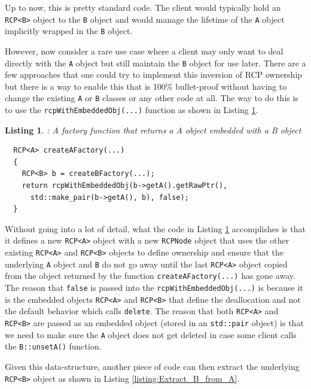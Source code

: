 \documentclass[pdf,ps2pdf,11pt]{SANDreport}
\newtheorem{listing}{Listing}
\begin{document}
Up to now, this is pretty standard code.  The client would typically
hold an {}\texttt{RCP<B>} object to the {}\texttt{B} object and would
manage the lifetime of the {}\texttt{A} object implicitly wrapped in
the {}\texttt{B} object.

However, now consider a rare use case where a client may only want to
deal directly with the {}\texttt{A} object but still maintain the
{}\texttt{B} object for use later.  There are a few approaches that
one could try to implement this inversion of RCP ownership but there
is a way to enable this that is 100\% bullet-proof without having to
change the existing {}\texttt{A} or {}\texttt{B} classes or any other
code at all.  The way to do this is to use the
{}\texttt{rcpWithEmbeddedObj(...)} function as shown in Listing
{}\ref{listing:A_owns_B_owns_A}.

\begin{listing}: A factory function that returns a A object
embedded with a B object \\
\label{listing:A_owns_B_owns_A}
{\small\begin{verbatim}
  RCP<A> createAFactory(...)
  {
    RCP<B> b = createBFactory(...);
    return rcpWithEmbeddedObj(b->getA().getRawPtr(),
      std::make_pair(b->getA(), b), false);
  }
\end{verbatim}}
\end{listing}

Without going into a lot of detail, what the code in Listing
{}\ref{listing:A_owns_B_owns_A} accomplishes is that it defines a new
{}\texttt{RCP<A>} object with a new {}\texttt{RCPNode} object that
uses the other existing {}\texttt{RCP<A>} and {}\texttt{RCP<B>}
objects to define ownership and ensure that the underlying
{}\texttt{A} object and {}\texttt{B} do not go away until the last
{}\texttt{RCP<A>} object copied from the object returned by the
function {}\texttt{createAFactory(...)} has gone away.  The reason
that {}\texttt{false} is passed into the
{}\texttt{rcpWithEmbeddedObj(...)} is because it is the embedded
objects {}\texttt{RCP<A>} and {}\texttt{RCP<B>} that define the
deallocation and not the default behavior which calls
{}\texttt{delete}.  The reason that both {}\texttt{RCP<A>} and
{}\texttt{RCP<B>} are passed as an embedded object (stored in an
{}\texttt{std::pair} object) is that we need to make sure the
{}\texttt{A} object does not get deleted in case some client calls the
{}\texttt{B::unsetA()} function.

Given this data-structure, another piece of code can then extract the
underlying {}\texttt{RCP<B>} object as shown in Listing
{}\ref{listing:Extract_B_from_A}.
\end{document}
